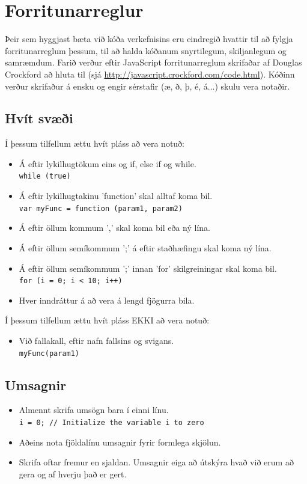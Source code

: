 \documentclass{article}
\theoremstyle{blueP}
\theoremstyle{greenS}
\begin{document}
\section{\Large Forritunarreglur}
Þeir sem hyggjast bæta við kóða verkefnisins eru eindregið hvattir til að fylgja forritunarreglum þessum, til að halda kóðanum snyrtilegum, skiljanlegum og samræmdum. Farið verður eftir JavaScript forritunarreglum skrifaðar af Douglas Crockford að hluta til (sjá \url{http://javascript.crockford.com/code.html}). Kóðinn verður skrifaður á ensku og engir sérstafir (æ, ð, þ, é, á...) skulu vera notaðir.

\subsection{Hvít svæði}
Í þessum tilfellum ættu hvít pláss að vera notuð:
\begin{itemize}
    \item Á eftir lykilhugtökum eins og if, else if og while. \\
    \lstinline|while (true)|
    \item Á eftir lykilhugtakinu 'function' skal alltaf koma bil. \\
    \lstinline|var myFunc = function (param1, param2)|
    \item Á eftir öllum kommum ',' skal koma bil eða ný lína.
    \item Á eftir öllum semíkommum ';' á eftir staðhæfingu skal koma ný lína.
    \item Á eftir öllum semíkommum ';' innan 'for' skilgreiningar skal koma bil. \\
    \lstinline|for (i = 0; i < 10; i++)|
    \item Hver inndráttur á að vera á lengd fjögurra bila.
\end{itemize}
Í þessum tilfellum ættu hvít pláss EKKI að vera notuð:
\begin{itemize}
    \item Við fallakall, eftir nafn fallsins og svigans. \\
    \lstinline|myFunc(param1)|
\end{itemize}

\subsection{Umsagnir}
\begin{itemize}
    \item Almennt skrifa umsögn bara í einni línu. \\ \lstinline|i = 0; // Initialize the variable i to zero|
    \item Aðeins nota fjöldalínu umsagnir fyrir formlega skjölun.
    \item Skrifa oftar fremur en sjaldan. Umsagnir eiga að útskýra hvað við erum að gera og af hverju það er gert. 
\end{itemize}
\end{document}
